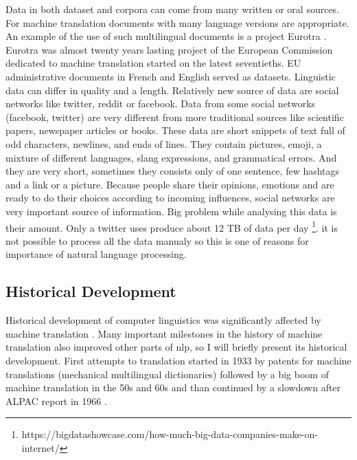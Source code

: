 Data in both dataset and corpora can come from many written or oral sources. For machine translation documents with many language versions are appropriate. An example of the use of such multilingual documents is a project Eurotra \citep{oakley1995final}.
Eurotra was almost twenty years lasting project of the European Commission dedicated to machine translation started on the latest seventieths. EU administrative documents in French and English served as datasets. %
Linguistic data can differ in quality and a length.  Relatively new source of data are social networks like twitter, reddit or facebook. Data from some social networks (facebook, twitter) are very different from more traditional sources like scientific papers, newspaper articles or books.  These data are short snippets of text full of odd characters, newlines, and ends of lines. They contain pictures, emoji, a mixture of different languages, slang expressions, and grammatical errors. And they are very short, sometimes they consists only of one sentence, few hashtags and a link or a picture. Because people share their opinions, emotions and are ready to do their choices according to incoming influences, social networks are very important source of information. Big problem while analysing this data is their amount. Only a twitter uses produce about 12 TB of data per day \footnote{https://bigdatashowcase.com/how-much-big-data-companies-make-on-internet/}. it is not possible to process all the data manualy so this is one of reasons for importance of natural language processing.  %

\subsection{Historical Development}
Historical development of computer linguistics was significantly affected by machine translation \citep{Wilks}. Many important milestones in the history of machine translation also improved other parts of \gls{nlp}, so I will briefly present its historical development. First attempts to translation started in 1933 by patents for machine translations (mechanical multilingual dictionaries) \citep{Hutchins}
followed by a big boom of machine translation in the 50s and 60s and than continued by a slowdown after ALPAC report in 1966 \citep{Hutchins1996}. 

